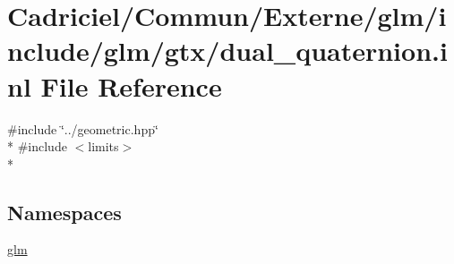 \hypertarget{dual__quaternion_8inl}{}\section{Cadriciel/\+Commun/\+Externe/glm/include/glm/gtx/dual\+\_\+quaternion.inl File Reference}
\label{dual__quaternion_8inl}
{\ttfamily \#include \char`\"{}../geometric.\+hpp\char`\"{}}\\*
{\ttfamily \#include $<$limits$>$}\\*
\subsection*{Namespaces}
\begin{DoxyCompactItemize}
\item 
 \hyperlink{namespaceglm}{glm}
\end{DoxyCompactItemize}
